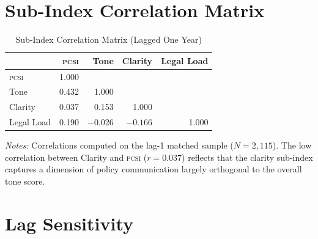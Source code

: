 \documentclass[12pt]{article}
\newcommand{\PCSI}{\textsc{pcsi}}
\begin{document}

\appendix

\section{Sub-Index Correlation Matrix}
\label{app:corrmatrix}

\begin{table}[htbp]
\centering
\caption{Sub-Index Correlation Matrix (Lagged One Year)}
\label{tab:a1}
\begin{tabular}{lrrrr}
\toprule
 & \PCSI{} & Tone & Clarity & Legal Load \\
\midrule
\PCSI{} & 1.000 & & & \\
Tone & 0.432 & 1.000 & & \\
Clarity & 0.037 & 0.153 & 1.000 & \\
Legal Load & 0.190 & $-0.026$ & $-0.166$ & 1.000 \\
\bottomrule
\end{tabular}
\begin{tablenotes}
\small
\item \textit{Notes:} Correlations computed on the lag-1 matched sample ($N=2{,}115$).
The low correlation between Clarity and \PCSI{} ($r=0.037$) reflects that the
clarity sub-index captures a dimension of policy communication largely orthogonal
to the overall tone score.
\end{tablenotes}
\end{table}

\section{Lag Sensitivity}
\label{app:lagsens}
\end{document}
